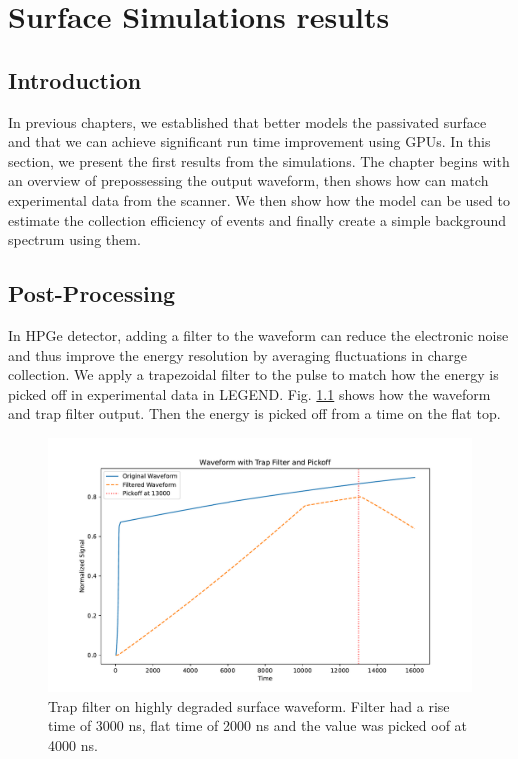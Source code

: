 \chapter{Surface Simulations results}
\label{chap:ehd_res}

\section{Introduction}
In previous chapters, we established that {\ehd} better models the passivated surface and that we can achieve significant run time improvement using GPUs. In this section, we present the first results from the simulations. The chapter begins with an overview of prepossessing the output waveform, then shows how {\ehd} can match experimental data from the scanner. We then show how the model can be used to estimate the collection efficiency of {\onbb} events and finally create a simple background spectrum using them.

\section{Post-Processing}

In HPGe detector, adding a filter to the waveform can reduce the electronic noise and thus improve the energy resolution by averaging fluctuations in charge collection. We apply a trapezoidal filter to the pulse to match how the energy is picked off in experimental data in LEGEND. Fig. \ref{ch5_fig_trap_filter} shows how the waveform and trap filter output. Then the energy is picked off from a time on the flat top.

\begin{figure}%
\includegraphics[trim={0cm 0cm 0cm 0cm},clip,width=0.9\linewidth]{ch5/figs/trap_filt.pdf}
\caption{Trap filter on highly degraded surface waveform. Filter had a rise time of 3000 ns, flat time of 2000 ns and the value was picked oof at 4000 ns.}
\label{ch5_fig_trap_filter}
\end{figure}

